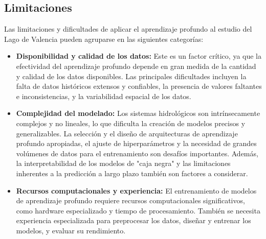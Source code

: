 \documentclass[12pt]{article}
\begin{document}
\subsection{Limitaciones}
Las limitaciones y dificultades de aplicar el aprendizaje profundo al estudio del Lago de Valencia pueden agruparse en las siguientes categorías:
\begin{itemize}
    \item \textbf{Disponibilidad y calidad de los datos:} Este es un factor crítico, ya que la efectividad del aprendizaje profundo depende en gran medida de la cantidad y calidad de los datos disponibles. Las principales dificultades incluyen la falta de datos históricos extensos y confiables, la presencia de valores faltantes e inconsistencias, y la variabilidad espacial de los datos.
    \item \textbf{Complejidad del modelado:} Los sistemas hidrológicos son intrínsecamente complejos y no lineales, lo que dificulta la creación de modelos precisos y generalizables. La selección y el diseño de arquitecturas de aprendizaje profundo apropiadas, el ajuste de hiperparámetros y la necesidad de grandes volúmenes de datos para el entrenamiento son desafíos importantes. Además, la interpretabilidad de los modelos de "caja negra" y las limitaciones inherentes a la predicción a largo plazo también son factores a considerar.
    \item \textbf{Recursos computacionales y experiencia:} El entrenamiento de modelos de aprendizaje profundo requiere recursos computacionales significativos, como hardware especializado y tiempo de procesamiento. También se necesita experiencia especializada para preprocesar los datos, diseñar y entrenar los modelos, y evaluar su rendimiento.
\end{itemize}
\end{document}
